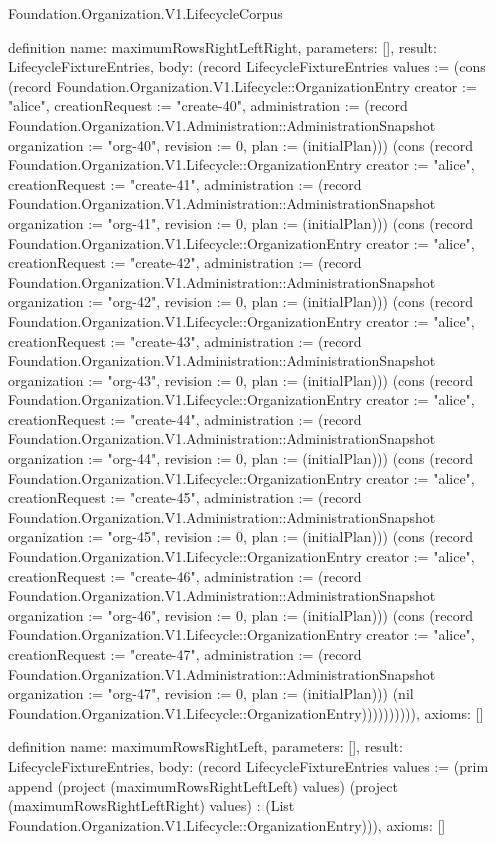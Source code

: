 \begin{lexlean}{Foundation.Organization.V1.LifecycleCorpus}
\begin{semanticmodule}
definition{
  name: maximumRowsRightLeftRight,
  parameters: [],
  result: LifecycleFixtureEntries,
  body: (record LifecycleFixtureEntries {values := (cons (record Foundation.Organization.V1.Lifecycle::OrganizationEntry {creator := "alice", creationRequest := "create-40", administration := (record Foundation.Organization.V1.Administration::AdministrationSnapshot {organization := "org-40", revision := 0, plan := (initialPlan)})}) (cons (record Foundation.Organization.V1.Lifecycle::OrganizationEntry {creator := "alice", creationRequest := "create-41", administration := (record Foundation.Organization.V1.Administration::AdministrationSnapshot {organization := "org-41", revision := 0, plan := (initialPlan)})}) (cons (record Foundation.Organization.V1.Lifecycle::OrganizationEntry {creator := "alice", creationRequest := "create-42", administration := (record Foundation.Organization.V1.Administration::AdministrationSnapshot {organization := "org-42", revision := 0, plan := (initialPlan)})}) (cons (record Foundation.Organization.V1.Lifecycle::OrganizationEntry {creator := "alice", creationRequest := "create-43", administration := (record Foundation.Organization.V1.Administration::AdministrationSnapshot {organization := "org-43", revision := 0, plan := (initialPlan)})}) (cons (record Foundation.Organization.V1.Lifecycle::OrganizationEntry {creator := "alice", creationRequest := "create-44", administration := (record Foundation.Organization.V1.Administration::AdministrationSnapshot {organization := "org-44", revision := 0, plan := (initialPlan)})}) (cons (record Foundation.Organization.V1.Lifecycle::OrganizationEntry {creator := "alice", creationRequest := "create-45", administration := (record Foundation.Organization.V1.Administration::AdministrationSnapshot {organization := "org-45", revision := 0, plan := (initialPlan)})}) (cons (record Foundation.Organization.V1.Lifecycle::OrganizationEntry {creator := "alice", creationRequest := "create-46", administration := (record Foundation.Organization.V1.Administration::AdministrationSnapshot {organization := "org-46", revision := 0, plan := (initialPlan)})}) (cons (record Foundation.Organization.V1.Lifecycle::OrganizationEntry {creator := "alice", creationRequest := "create-47", administration := (record Foundation.Organization.V1.Administration::AdministrationSnapshot {organization := "org-47", revision := 0, plan := (initialPlan)})}) (nil Foundation.Organization.V1.Lifecycle::OrganizationEntry)))))))))}),
  axioms: []
}

definition{
  name: maximumRowsRightLeft,
  parameters: [],
  result: LifecycleFixtureEntries,
  body: (record LifecycleFixtureEntries {values := (prim append (project (maximumRowsRightLeftLeft) values) (project (maximumRowsRightLeftRight) values) : (List Foundation.Organization.V1.Lifecycle::OrganizationEntry))}),
  axioms: []
}


\end{semanticmodule}
\end{lexlean}
